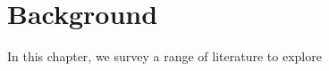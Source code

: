 \chapter{Background}
\label{ch:background}

In this chapter, we survey a range of literature to explore




